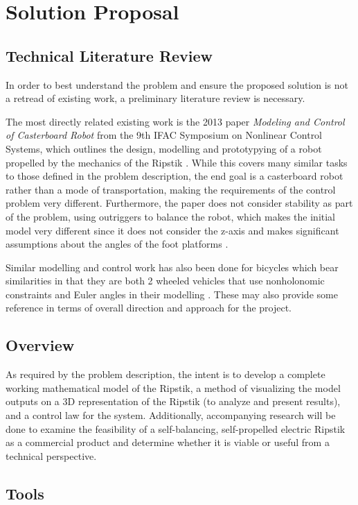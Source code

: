 \section{Solution Proposal} \label{solution}
\subsection{Technical Literature Review}
In order to best understand the problem and ensure the proposed solution is not a retread of existing work, a preliminary literature review is necessary.

The most directly related existing work is the 2013 paper \textit{Modeling and Control of Casterboard Robot} from the 9th IFAC Symposium on Nonlinear Control Systems, which outlines the design, modelling and prototypying of a robot propelled by the mechanics of the Ripstik \cite{CasterboardRobot}. While this covers many similar tasks to those defined in the problem description, the end goal is a casterboard robot rather than a mode of transportation, making the requirements of the control problem very different. Furthermore, the paper does not consider stability as part of the problem, using outriggers to balance the robot, which makes the initial model very different since it does not consider the z-axis and makes significant assumptions about the angles of the foot platforms \cite{CasterboardRobot}.

Similar modelling and control work has also been done for bicycles \cite{BikeModel,BikeControl} which bear similarities in that they are both 2 wheeled vehicles that use nonholonomic constraints and Euler angles in their modelling \cite{BikeModel}. These may also provide some reference in terms of overall direction and approach for the project.
\subsection{Overview}
As required by the problem description, the intent is to develop a complete working mathematical model of the Ripstik, a method of visualizing the model outputs on a 3D representation of the Ripstik (to analyze and present results), and a control law for the system. Additionally, accompanying research will be done to examine the feasibility of a self-balancing, self-propelled electric Ripstik as a commercial product and determine whether it is viable or useful from a technical perspective.
\subsection{Tools}
